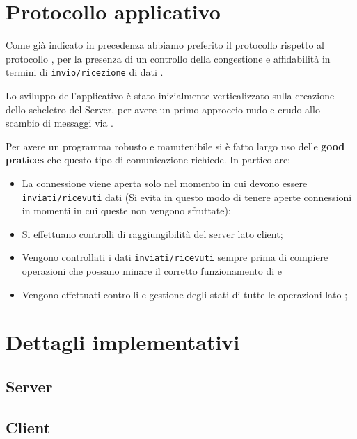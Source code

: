 \documentclass{./document_class}
\begin{document}
    \chapter{Protocollo applicativo}
      Come già indicato in precedenza abbiamo preferito il protocollo  rispetto al protocollo , per la presenza di un controllo della congestione e affidabilità in termini di \texttt{invio/ricezione} di dati\footnotemark {} .

      Lo sviluppo dell'applicativo è stato inizialmente verticalizzato sulla creazione dello scheletro del Server, per avere un primo approccio nudo e crudo allo scambio di messaggi via .

      Per avere un programma robusto e manutenibile si è fatto largo uso delle \textbf{good pratices} che questo tipo di comunicazione richiede. In particolare:
      \begin{itemize}
        \item La connessione viene aperta solo nel momento in cui devono essere \texttt{inviati/ricevuti} dati (Si evita in questo modo di tenere aperte connessioni in momenti in cui queste non vengono sfruttate);
        \item Si effettuano controlli di raggiungibilità del server lato client\footnotemark {};
        \item Vengono controllati i dati \texttt{inviati/ricevuti} sempre prima di compiere operazioni che possano minare il corretto funzionamento di  e  \footnotemark {}
        \item Vengono effettuati controlli e gestione degli stati di tutte le operazioni lato ;
      \end{itemize}

    \chapter{Dettagli implementativi}
      \section{Server}
        \newpage
      \section{Client}
        \newpage
\end{document}
